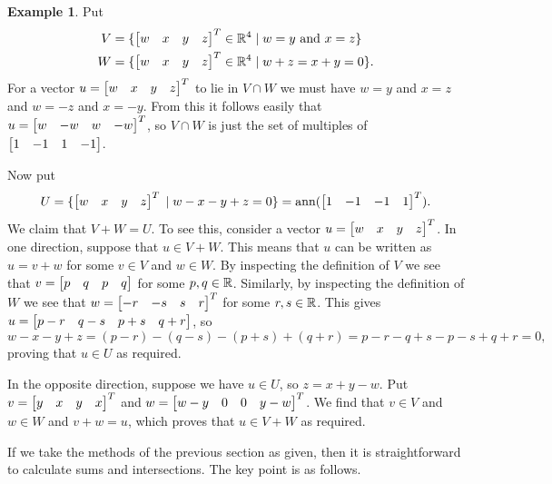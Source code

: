 \documentclass[reqno]{amsart}
\theoremstyle{definition}
\newtheorem{example}[theorem]{Example}
\begin{document}
\begin{example}\label{eg-sum-meet-ii}
 Put
 \begin{align*}
  V &= \{\left[\begin{matrix} w&x&y&z\end{matrix}\right]^T\in{\mathbb{R}}^4\;|\; w=y \text{ and } x=z\} \\
  W &= \{\left[\begin{matrix} w&x&y&z\end{matrix}\right]^T\in{\mathbb{R}}^4\;|\; w+z=x+y=0\}.
 \end{align*}
 For a vector $u=\left[\begin{matrix} w&x&y&z\end{matrix}\right]^T$ to lie in $V\cap W$ we must have
 $w=y$ and $x=z$ and $w=-z$ and $x=-y$.  From this it follows easily
 that $u=\left[\begin{matrix} w&-w&w&-w\end{matrix}\right]^T$, so $V\cap W$ is just the set of
 multiples of $\left[\begin{matrix} 1&-1&1&-1\end{matrix}\right]$.

 Now put
 \[ U = \{\left[\begin{matrix} w&x&y&z\end{matrix}\right]^T \;|\; w-x-y+z=0\}
      = \operatorname{ann}(\left[\begin{matrix} 1&-1&-1&1\end{matrix}\right]^T).
 \]
 We claim that $V+W=U$.  To see this, consider a vector
 $u=\left[\begin{matrix} w&x&y&z\end{matrix}\right]^T$.   In one direction, suppose that $u\in V+W$.
 This means that $u$ can be written as $u=v+w$ for some $v\in V$ and
 $w\in W$.  By inspecting the definition of $V$ we see that
 $v=\left[\begin{matrix} p&q&p&q\end{matrix}\right]$ for some $p,q\in{\mathbb{R}}$.  Similarly, by inspecting
 the definition of $W$ we see that $w=\left[\begin{matrix} -r&-s&s&r\end{matrix}\right]^T$ for some
 $r,s\in{\mathbb{R}}$.  This gives $u=\left[\begin{matrix} p-r&q-s&p+s&q+r\end{matrix}\right]$, so
 \[ w-x-y+z = (p-r)-(q-s)-(p+s)+(q+r)
     =p-r-q+s-p-s+q+r = 0,
 \]
 proving that $u\in U$ as required.

 In the opposite direction, suppose we have $u\in U$, so $z=x+y-w$.
 Put $v=\left[\begin{matrix} y&x&y&x\end{matrix}\right]^T$ and $w=\left[\begin{matrix} w-y&0&0&y-w\end{matrix}\right]^T$.  We find
 that $v\in V$ and $w\in W$ and $v+w=u$, which proves that $u\in V+W$
 as required.
\end{example}

If we take the methods of the previous section as given, then it is
straightforward to calculate sums and intersections.  The key point is
as follows.
\end{document}
